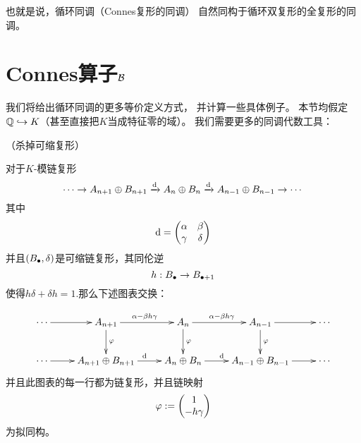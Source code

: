 也就是说，循环同调（Connes复形的同调）
自然同构于循环双复形的全复形的同调。




\section{Connes算子$\mathcal{B}$}

我们将给出循环同调的更多等价定义方式，
并计算一些具体例子。
本节均假定$\mathbb{Q}\hookrightarrow K$（甚至直接把$K$当成特征零的域）。
我们需要更多的同调代数工具：

\begin{lemma}（杀掉可缩复形）
\label{杀掉可缩复形引理-lemma}

对于$K$-模链复形
$$\cdots\to
A_{n+1}\oplus B_{n+1}\xrightarrow{\mathrm{d}}
A_n\oplus B_n\xrightarrow{\mathrm{d}}
A_{n-1}\oplus B_{n-1}\to\cdots$$
其中
$$\mathrm{d}=
\begin{pmatrix}
\alpha & \beta \\
\gamma & \delta
\end{pmatrix}$$
并且$(B_{\bullet},\delta)$是可缩链复形，其同伦逆
$$h:B_{\bullet}\to B_{\bullet+1}$$
使得$h\delta+\delta h=1$.那么下述图表交换：

$$
\xymatrix{
   \cdots   \ar[r]
 & A_{n+1}  \ar[r]^{\alpha-\beta h\gamma} \ar[d]^\fai
 & A_{n  }  \ar[r]^{\alpha-\beta h\gamma} \ar[d]^\fai
 & A_{n-1}  \ar[r]^{                    } \ar[d]^\fai
 & \cdots
\\
   \cdots                 \ar[r]
 & A_{n+1}\oplus B_{n+1}  \ar[r]^{\td}
 & A_{n  }\oplus B_{n  }  \ar[r]^{\td}
 & A_{n-1}\oplus B_{n-1}  \ar[r]
 & \cdots
}
$$
并且此图表的每一行都为链复形，并且链映射
$$\varphi:=
\begin{pmatrix}
1\\
-h\gamma
\end{pmatrix}$$
为拟同构。
\end{lemma}

